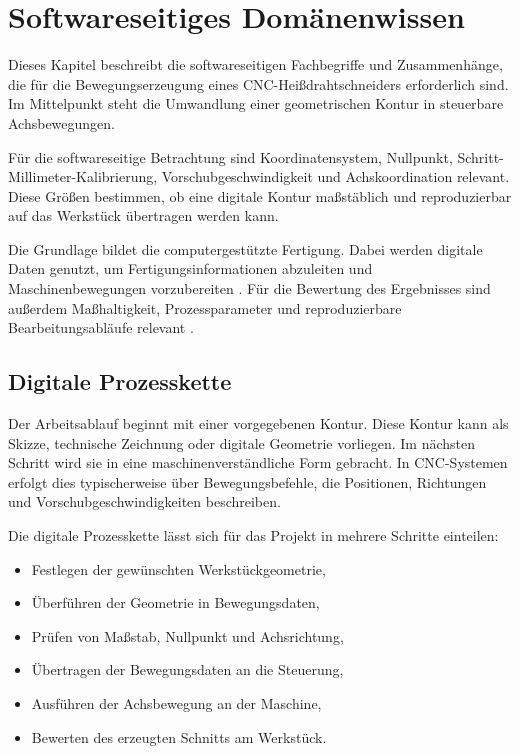 
%
%
%

\chapter{Softwareseitiges Domänenwissen}
\label{chap:domaenenwissen_software}

Dieses Kapitel beschreibt die softwareseitigen Fachbegriffe und Zusammenhänge, die für die Bewegungserzeugung eines CNC-Heißdrahtschneiders erforderlich sind. Im Mittelpunkt steht die Umwandlung einer geometrischen Kontur in steuerbare Achsbewegungen.

Für die softwareseitige Betrachtung sind Koordinatensystem, Nullpunkt, Schritt-Millimeter-Kalibrierung, Vorschubgeschwindigkeit und Achskoordination relevant. Diese Größen bestimmen, ob eine digitale Kontur maßstäblich und reproduzierbar auf das Werkstück übertragen werden kann.

Die Grundlage bildet die computergestützte Fertigung. Dabei werden digitale Daten genutzt, um Fertigungsinformationen abzuleiten und Maschinenbewegungen vorzubereiten \cite{Hehenberger:2020}. Für die Bewertung des Ergebnisses sind außerdem Maßhaltigkeit, Prozessparameter und reproduzierbare Bearbeitungsabläufe relevant \cite{Fritz:2022}.

\section{Digitale Prozesskette}
\label{sec:digitale_prozesskette}

Der Arbeitsablauf beginnt mit einer vorgegebenen Kontur. Diese Kontur kann als Skizze, technische Zeichnung oder digitale Geometrie vorliegen. Im nächsten Schritt wird sie in eine maschinenverständliche Form gebracht. In CNC-Systemen erfolgt dies typischerweise über Bewegungsbefehle, die Positionen, Richtungen und Vorschubgeschwindigkeiten beschreiben.

Die digitale Prozesskette lässt sich für das Projekt in mehrere Schritte einteilen:

\begin{itemize}
	\item Festlegen der gewünschten Werkstückgeometrie,
	\item Überführen der Geometrie in Bewegungsdaten,
	\item Prüfen von Maßstab, Nullpunkt und Achsrichtung,
	\item Übertragen der Bewegungsdaten an die Steuerung,
	\item Ausführen der Achsbewegung an der Maschine,
	\item Bewerten des erzeugten Schnitts am Werkstück.
\end{itemize}

